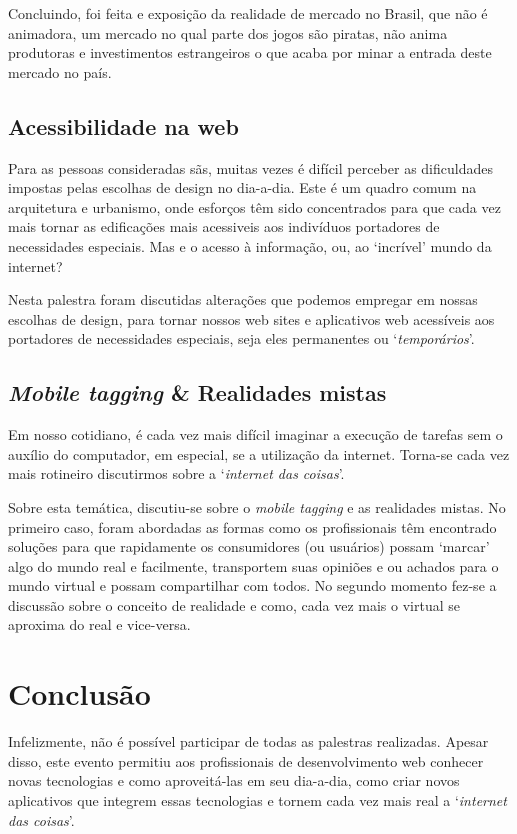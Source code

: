 \documentclass[a4paper]{report}
\begin{document}
            Concluindo, foi feita e exposição da realidade de mercado no
            Brasil, que não é animadora, um mercado no qual parte dos jogos
            são piratas, não anima produtoras e investimentos estrangeiros
            o que acaba por minar a entrada deste mercado no país.

            \subsection{Acessibilidade na web}
            Para as pessoas consideradas sãs, muitas vezes é difícil perceber
            as dificuldades impostas pelas escolhas de design no dia-a-dia.
            Este é um quadro comum na arquitetura e urbanismo, onde esforços
            têm sido concentrados para que cada vez mais tornar as edificações
            mais acessiveis aos indivíduos portadores de necessidades
            especiais. Mas e o acesso à informação, ou, ao `incrível' mundo da
            internet?

            Nesta palestra foram discutidas alterações que podemos empregar em
            nossas escolhas de design, para tornar nossos web sites e
            aplicativos web acessíveis aos portadores de necessidades
            especiais, seja eles permanentes ou `\emph{temporários}'.

            \subsection{\emph{Mobile tagging} \& Realidades mistas}
            Em nosso cotidiano, é cada vez mais difícil imaginar a execução de
            tarefas sem o auxílio do computador, em especial, se a utilização
            da internet. Torna-se cada vez mais rotineiro discutirmos sobre a
            `\emph{internet das coisas}'.

            Sobre esta temática, discutiu-se sobre o \emph{mobile tagging} e as
            realidades mistas. No primeiro caso, foram abordadas as formas como
            os profissionais têm encontrado soluções para que rapidamente os
            consumidores (ou usuários) possam `marcar' algo do mundo real e
            facilmente, transportem suas opiniões e ou achados para o mundo
            virtual e possam compartilhar com todos. No segundo momento fez-se
            a discussão sobre o conceito de realidade e como, cada vez mais o
            virtual se aproxima do real e vice-versa.

        \section{Conclusão}
        Infelizmente, não é possível participar de todas as palestras
        realizadas. Apesar disso, este evento permitiu aos profissionais de
        desenvolvimento web conhecer novas tecnologias e como aproveitá-las em
        seu dia-a-dia, como criar novos aplicativos que integrem essas
        tecnologias e tornem cada vez mais real a `\emph{internet das coisas}'.
\end{document}
